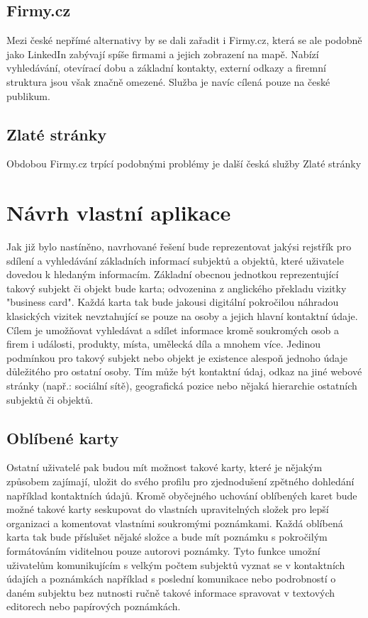 	\subsection{Firmy.cz}

	Mezi české nepřímé alternativy by se dali zařadit i Firmy.cz, která se ale podobně jako LinkedIn zabývají
	spíše firmami a jejich zobrazení na mapě.
	Nabízí vyhledávání, otevírací dobu a základní kontakty, externí odkazy a firemní struktura jsou však značně omezené.
	Služba je navíc cílená pouze na české publikum.

	\subsection{Zlaté stránky}

	Obdobou Firmy.cz trpící podobnými problémy je další česká služby Zlaté stránky


\section{Návrh vlastní aplikace}


Jak již bylo nastíněno, navrhované řešení bude reprezentovat jakýsi rejstřík pro sdílení a vyhledávání základních informací
subjektů a objektů, které uživatele dovedou k hledaným informacím.
Základní obecnou jednotkou reprezentující takový subjekt či objekt bude karta; odvozenina z anglického překladu vizitky "business card".
Každá karta tak bude jakousi digitální pokročilou náhradou klasických vizitek nevztahující se pouze na osoby a jejich
hlavní kontaktní údaje.
Cílem je umožňovat vyhledávat a sdílet informace kromě soukromých osob a firem i události, produkty, místa, umělecká díla a mnohem více.
Jedinou podmínkou pro takový subjekt nebo objekt je existence alespoň jednoho údaje důležitého pro ostatní osoby.
Tím může být kontaktní údaj, odkaz na jiné webové stránky (např.: sociální sítě), geografická pozice nebo
nějaká hierarchie ostatních subjektů či objektů.

	\subsection{Oblíbené karty}

	Ostatní uživatelé pak budou mít možnost takové karty, které je nějakým způsobem zajímají, uložit do svého profilu pro
	zjednodušení zpětného dohledání například kontaktních údajů.
	Kromě obyčejného uchování oblíbených karet bude možné takové karty seskupovat do vlastních upravitelných složek pro
	lepší organizaci a komentovat vlastními soukromými poznámkami.
	Každá oblíbená karta tak bude příslušet nějaké složce a bude mít poznámku s pokročilým formátováním viditelnou pouze
	autorovi poznámky.
	Tyto funkce umožní uživatelům komunikujícím s velkým počtem subjektů vyznat se v kontaktních údajích a poznámkách
	například s poslední komunikace nebo podrobností o daném subjektu bez nutnosti ručně takové informace spravovat v
	textových editorech nebo papírových poznámkách.

